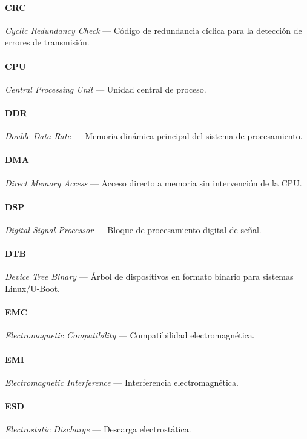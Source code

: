 \paragraph{CRC} \textit{Cyclic Redundancy Check} --- Código de redundancia cíclica para la detección de errores de transmisión.

\paragraph{CPU} \textit{Central Processing Unit} --- Unidad central de proceso.

\paragraph{DDR} \textit{Double Data Rate} --- Memoria dinámica principal del sistema de procesamiento.

\paragraph{DMA} \textit{Direct Memory Access} --- Acceso directo a memoria sin intervención de la CPU.

\paragraph{DSP} \textit{Digital Signal Processor} --- Bloque de procesamiento digital de señal.

\paragraph{DTB} \textit{Device Tree Binary} --- Árbol de dispositivos en formato binario para sistemas Linux/U-Boot.

\paragraph{EMC} \textit{Electromagnetic Compatibility} --- Compatibilidad electromagnética.

\paragraph{EMI} \textit{Electromagnetic Interference} --- Interferencia electromagnética.

\paragraph{ESD} \textit{Electrostatic Discharge} --- Descarga electrostática.


